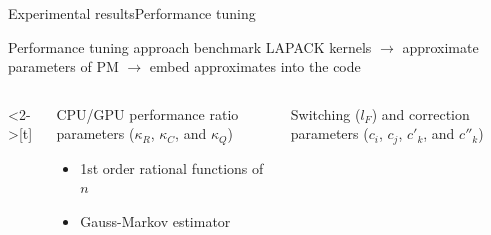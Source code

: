 \documentclass[xcolor=table,final]{beamer} %
\begin{document}
\begin{frame}{Experimental results}{Performance tuning}

  \begin{block}{Performance tuning approach}
    benchmark LAPACK kernels 
    $\to$
    approximate parameters of PM %
    $\to$
    embed approximates into the code
  \end{block}

  \begin{columns}<2->[t]%
    \begin{column}[t]{0.5\textwidth}
      \centering
      CPU/GPU performance ratio parameters 
      ($\kappa_R$, $\kappa_C$, and $\kappa_Q$)

      
      \begin{itemize}
        \small
      \item 1st order rational functions of $n$
      \item Gauss-Markov estimator
      \end{itemize}
    \end{column}

    \begin{column}[t]{0.5\textwidth}
      \centering
      Switching ($l_F$) and  correction parameters 
      ($c_i$, $c_j$, $c'_k$, and $c''_k$)


\end{column}
\end{columns}
\end{frame}
\end{document}
